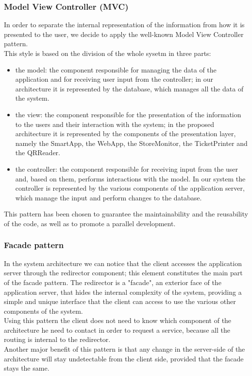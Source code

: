 \subsubsection{Model View Controller (MVC)}
In order to separate the internal representation of the information from how it is presented to the user, we decide to apply the well-known Model View Controller pattern.\\
This style is based on the division of the whole sysetm in three parts:
\begin{itemize}
	\item the model: the component responsible for managing the data of the application and for receiving user input from the controller; in our architecture it is represented by the database, which manages all the data of the system.
	\item the view: the component responsible for the presentation of the information to the users and their interaction with the system; in the proposed architecture it is represented by the components of the presentation layer, namely the SmartApp, the WebApp, the StoreMonitor, the TicketPrinter and the QRReader.
	\item the controller: the component responsible for receiving input from the user and, based on them, performs interactions with the model. In our system the controller is represented by the various components of the application server, which manage the input and perform changes to the database.
\end{itemize}
This pattern has been chosen to guarantee the maintainability and the reusability of the code, as well as to promote a parallel development.
\subsubsection{Facade pattern}
In the system architecture we can notice that the client accesses the application server through the redirector component; this element constitutes the main part of the facade pattern. The redirector is a "facade", an exterior face of the application server, that hides the internal complexity of the system, providing a simple and unique interface that the client can access to use the various other components of the system.\\
Using this pattern the client does not need to know which component of the architecture he need to contact in order to request a service, because all the routing is internal to the redirector.\\
Another major benefit of this pattern is that any change in the server-side of the architecture will stay undetectable from the client side, provided that the facade stays the same.
